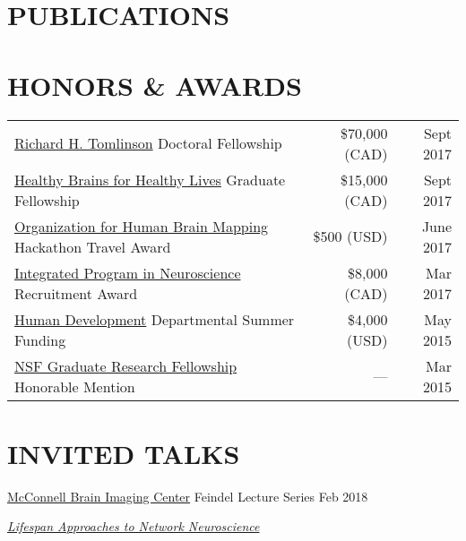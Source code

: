 \documentclass{friggeri-bib}
\begin{document}
\section{PUBLICATIONS}


\section{HONORS \& AWARDS}
\vspace{-5pt}

\noindent\begin{tabularx}{\textwidth}{@{}lrr@{}}

\href{https://www.mcgill.ca/gps/funding/achievements/tomlinsonscholars}{Richard H. Tomlinson} Doctoral Fellowship & \$70,000 (CAD) & Sept 2017 \\

\href{https://www.mcgill.ca/hbhl/about-hbhl}{Healthy Brains for Healthy Lives} Graduate Fellowship & \$15,000 (CAD) & Sept 2017 \\

\href{https://ohbm.github.io/hackathon2017/}{Organization for Human Brain Mapping} Hackathon Travel Award & \$500 (USD) & June 2017 \\

\href{http://www.mcgill.ca/ipn/}{Integrated Program in Neuroscience} Recruitment Award & \$8,000 (CAD) & Mar 2017 \\

\href{http://www.human.cornell.edu/hd/}{Human Development} Departmental Summer Funding & \$4,000 (USD) & May 2015 \\

\href{https://www.nsfgrfp.org/}{NSF Graduate Research Fellowship} Honorable Mention & --- & Mar 2015
\end{tabularx}

\vspace{15pt}

\section{INVITED TALKS}

\href{https://www.mcgill.ca/bic/home}{McConnell Brain Imaging Center} Feindel Lecture Series \hfill Feb 2018 \\[0.15cm]
\begin{minipage}{10cm}
\textit{\href{http://emdupre.me/feindel-slides}{Lifespan Approaches to Network Neuroscience}}
\end{minipage} \\
\vspace{5pt}
\end{document}
